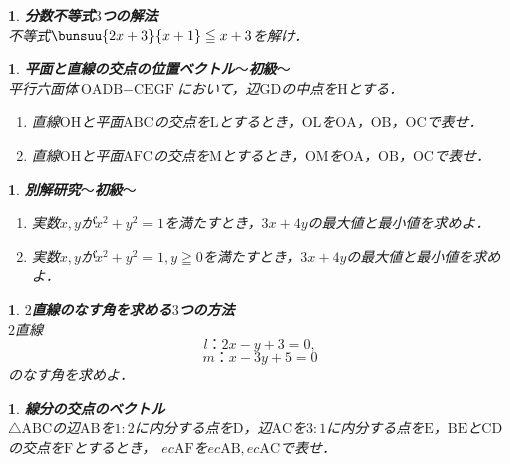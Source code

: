 \documentclass[10pt,
fleqn,
dvipdfmx,
uplatex
]{jsarticle}
\newtheorem{question}[Question]{}
\begin{document}
\begin{question}{\bf\boldmath 分数不等式$3$つの解法}\\
不等式$\bunsuu{{2x+3}}{{x+1}}\leqq x+3$を解け．
\end{question}



\begin{question}{\bf\boldmath 平面と直線の交点の位置ベクトル$〜$初級$〜$}\\
平行六面体$\text{OADB}-\text{CEGF}$において，辺$\text{GD}$の中点を$\text{H}$とする．
\begin{enumerate}
\item 直線$\text{OH}$と平面$\text{ABC}$の交点を$\text{L}$とするとき，$\text{OL}$を$\text{OA}$，$\text{OB}$，$\text{OC}$で表せ．
\item 直線$\text{OH}$と平面$\text{AFC}$の交点を$\text{M}$とするとき，$\text{OM}$を$\text{OA}$，$\text{OB}$，$\text{OC}$で表せ．
\end{enumerate}

\end{question}



\begin{question}{\bf\boldmath 別解研究$〜$初級$〜$}\\

\begin{enumerate}
\item 実数$x, y$が$x^2+y^2=1$を満たすとき，$3x+4y$の最大値と最小値を求めよ．
\item 実数$x, y$が$x^2+y^2=1, y\geqq 0$を満たすとき，$3x+4y$の最大値と最小値を求めよ．
\end{enumerate}

\end{question}



\begin{question}{\bf\boldmath $2$直線のなす角を求める$3$つの方法}\\
$2$直線
\[l：2x-y+3=0, \]
\[m：x-3y+5=0\]
のなす角を求めよ．
\end{question}



\begin{question}{\bf\boldmath 線分の交点のベクトル}\\
$\triangle \text{ABC}$の辺$\text{AB}$を$1:2$に内分する点を$\text{D}$，辺$\text{AC}$を$3:1$に内分する点を$\text{E}$，$\text{BE}$と$\text{CD}$の交点を$\text{F}$とするとき，
$ec{\text{AF}}$を$ec{\text{AB}}, ec{\text{AC}}$で表せ．
\end{question}
\end{document}
